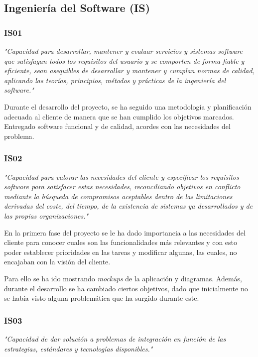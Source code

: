 \subsection{Ingeniería del Software (IS)}

\subsubsection{IS01}
\textit{"Capacidad para desarrollar, mantener y evaluar servicios y sistemas software que
satisfagan todos los requisitos del usuario y se comporten de forma fiable y
eficiente, sean asequibles de desarrollar y mantener y cumplan normas de
calidad, aplicando las teorías, principios, métodos y prácticas de la ingeniería del
software."}

\medskip
Durante el desarrollo del proyecto, se ha seguido una metodología y planificación adecuada
al cliente de manera que se han cumplido los objetivos marcados. Entregado software
funcional y de calidad, acordes con las necesidades del problema.

\subsubsection{IS02}
\textit{"Capacidad para valorar las necesidades del cliente y especificar los requisitos
software para satisfacer estas necesidades, reconciliando objetivos en
conflicto mediante la búsqueda de compromisos aceptables dentro de
las limitaciones derivadas del coste, del tiempo, de la existencia de sistemas ya
desarrollados y de las propias organizaciones."}

\medskip
En la primera fase del proyecto se le ha dado importancia a las necesidades del cliente
para conocer cuales son las funcionalidades más relevantes y con esto poder establecer
prioridades en las tareas y modificar algunas, las cuales, no encajaban con la visión
del cliente.

\medskip
Para ello se ha ido mostrando \textit{mockups} de la aplicación y diagramas. Además, durante
el desarrollo se ha cambiado ciertos objetivos, dado que inicialmente no se había visto
alguna problemática que ha surgido durante este.

\subsubsection{IS03}
\textit{"Capacidad de dar solución a problemas de integración en función de las estrategias,
estándares y tecnologías disponibles."}

